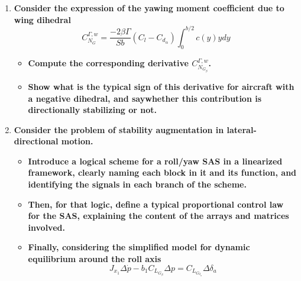 \begin{enumerate}
\begin{itemize}
    \end{itemize}
    \item \textbf{Consider the expression of the yawing moment coefficient due to wing dihedral}
    \begin{equation}
        C_{N_G}^{\Gamma,w} = \frac{-2\beta\Gamma}{Sb} (C_l -C_{d_\alpha}) \int_0^{b/2}c(y) y dy
    \end{equation}
    \begin{itemize}
        \item \textbf{Compute the corresponding derivative $C_{N_{G_\beta}}^{\Gamma,w}$.}
        \item \textbf{Show what is the typical sign of this derivative for aircraft with a negative dihedral, and saywhether this contribution is directionally stabilizing or not.}
    \end{itemize}
    \item \textbf{Consider the problem of stability augmentation in lateral-directional motion.}
    \begin{itemize}
        \item \textbf{Introduce a logical scheme for a roll/yaw SAS in a linearized framework, clearly naming each block in it and its function, and identifying the signals in each branch of the scheme.}
        \item \textbf{Then, for that logic, define a typical proportional control law for the SAS, explaining the content of the arrays and matrices involved.}
        \item \textbf{Finally, considering the simplified model for dynamic equilibrium around the roll axis}
        \begin{equation}
            J_{x_1} \Delta\dot p - b_1 C_{L_{G_\beta}}\Delta p = C_{L_{G_{\delta_a}}}\Delta\delta_a
        \end{equation}
    \end{itemize}
\end{enumerate}